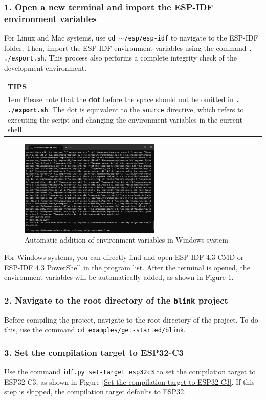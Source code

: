 \documentclass[a4paper,12pt,openany]{book}
\newcommand{\note}[2][NOTE]{ %
\vspace{6pt}
\begin{tabular}{b{\textwidth}}
\hline
\fontfamily{phv}\selectfont \textbf{#1}\\
\leftskip 1em #2\\
\hline
\end{tabular}
}
\begin{document}
\subsubsection{1. Open a new terminal and import the ESP-IDF environment variables}
For Linux and Mac systems, use \texttt{cd $\sim$/esp/esp-idf} to navigate to the ESP-IDF folder. Then, import the ESP-IDF environment variables using the command \verb|. ./export.sh|. This process also performs a complete integrity check of the development environment.

\note[TIPS]{Please note that the \textbf{dot} before the space should not be omitted in \textbf{\texttt{. ./export.sh}}. The dot is equivalent to the \texttt{source} directive, which refers to executing the script and changing the environment variables in the current shell.}

\begin{figure}[h!]
    \Centering
    \includegraphics[width=0.6\textwidth]{D4Z/4-17}
    \caption{Automatic addition of environment variables in Windows system}
    \label{Automatic addition of environment variables in Windows system}
\end{figure}

For Windows systems, you can directly find and open ESP-IDF 4.3 CMD or ESP-IDF 4.3 PowerShell in the program list. After the terminal is opened, the environment variables will be automatically added, as shown in Figure \ref{Automatic addition of environment variables in Windows system}.

\subsubsection{2. Navigate to the root directory of the \texttt{blink} project}
Before compiling the project, navigate to the root directory of the project. To do this, use the command \verb|cd examples/get-started/blink|.

\subsubsection{3. Set the compilation target to ESP32-C3}
Use the command \verb|idf.py set-target esp32c3| to set the compilation target to ESP32-C3, as shown in Figure \ref{Set the compilation target to ESP32-C3}. If this step is skipped, the compilation target defaults to ESP32.
\end{document}
